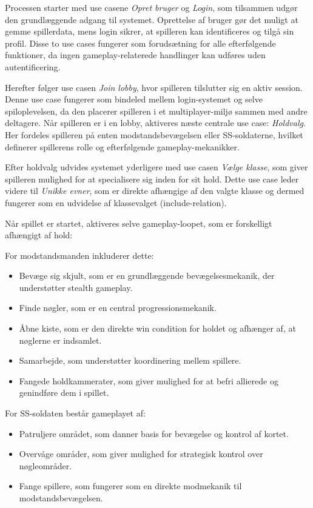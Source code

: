 Processen starter med use casene \textit{Opret bruger} og \textit{Login}, som tilsammen udgør den grundlæggende adgang til systemet. Oprettelse af bruger gør det muligt at gemme spillerdata, mens login sikrer, at spilleren kan identificeres og tilgå sin profil. Disse to use cases fungerer som forudsætning for alle efterfølgende funktioner, da ingen gameplay-relaterede handlinger kan udføres uden autentificering.

Herefter følger use casen \textit{Join lobby}, hvor spilleren tilslutter sig en aktiv session. Denne use case fungerer som bindeled mellem login-systemet og selve spiloplevelsen, da den placerer spilleren i et multiplayer-miljø sammen med andre deltagere. Når spilleren er i en lobby, aktiveres næste centrale use case: \textit{Holdvalg}. Her fordeles spilleren på enten modstandsbevægelsen eller SS-soldaterne, hvilket definerer spillerens rolle og efterfølgende gameplay-mekanikker.

Efter holdvalg udvides systemet yderligere med use casen \textit{Vælge klasse}, som giver spilleren mulighed for at specialisere sig inden for sit hold. Dette use case leder videre til \textit{Unikke evner}, som er direkte afhængige af den valgte klasse og dermed fungerer som en udvidelse af klassevalget (include-relation).

Når spillet er startet, aktiveres selve gameplay-loopet, som er forskelligt afhængigt af hold:

For modstandsmanden inkluderer dette:

\begin{itemize}
    \item Bevæge sig skjult, som er en grundlæggende bevægelsesmekanik, der understøtter stealth gameplay.
    \item Finde nøgler, som er en central progressionsmekanik.
    \item Åbne kiste, som er den direkte win condition for holdet og afhænger af, at nøglerne er indsamlet.
    \item Samarbejde, som understøtter koordinering mellem spillere.
    \item Fangede holdkammerater, som giver mulighed for at befri allierede og genindføre dem i spillet.
\end{itemize}

For SS-soldaten består gameplayet af:

\begin{itemize}
    \item Patruljere området, som danner basis for bevægelse og kontrol af kortet.
    \item Overvåge områder, som giver mulighed for strategisk kontrol over nøgleområder.
    \item Fange spillere, som fungerer som en direkte modmekanik til modstandsbevægelsen.
\end{itemize}

